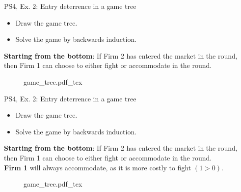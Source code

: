 \begin{frame}{PS4, Ex. 2: Entry deterrence in a game tree}
  \begin{multicols}{2}
    \begin{itemize}
      \item[(a)] Draw the game tree.
      \item[(b)] Solve the game by backwards induction.
    \end{itemize}
    \textbf{Starting from the bottom}: If Firm 2 has entered the market in the  round, then Firm 1 can choose to either fight or accommodate in the  round.
  \vfill\null \columnbreak
    \begin{figure}[!h]
      \begin{center}
      \def\svgwidth{1.0\columnwidth}
      {game_tree.pdf_tex}
      \end{center}
    \end{figure}
  \vfill\null
  \end{multicols}
\end{frame}
\begin{frame}{PS4, Ex. 2: Entry deterrence in a game tree}
  \begin{multicols}{2}
    \begin{itemize}
      \item[(a)] Draw the game tree.
      \item[(b)] Solve the game by backwards induction.
    \end{itemize}
    \textbf{Starting from the bottom}: If Firm 2 has entered the market in the  round, then Firm 1 can choose to either fight or accommodate in the  round.\\\medskip
    \textbf{Firm 1} will always accommodate, as it is more costly to fight $(1>0)$.
  \vfill\null \columnbreak
    \begin{figure}[!h]
      \begin{center}
      \def\svgwidth{1.0\columnwidth}
      {game_tree.pdf_tex}
      \end{center}
    \end{figure}
  \vfill\null
  \end{multicols}
\end{frame}
